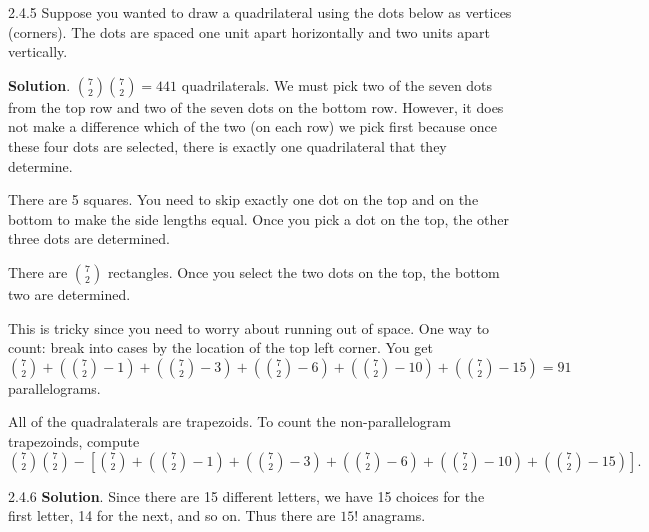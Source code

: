 \documentclass[11pt,]{book}
\theoremstyle{ptxplainnotitle}
\theoremstyle{ptxplaintitle}
\theoremstyle{ptxdefinitionnotitle}
\theoremstyle{ptxdefinitiontitle}
\theoremstyle{ptxdefinitionnotitle}
\theoremstyle{ptxdefinitiontitle}
\theoremstyle{ptxdefinitionnotitle}
\theoremstyle{ptxdefinitiontitle}
\theoremstyle{ptxdefinitiontitlenonumber}
\theoremstyle{ptxdefinitiontitlenonumber}
\numberwithin{equation}{chapter}
\begin{document}
\begin{divisionexercise}{2.4.5}
\hypertarget{p-1505}{}%
Suppose you wanted to draw a quadrilateral using the dots below as vertices (corners).  The dots are spaced one unit apart horizontally and two units apart vertically.%
\begin{sidebyside}{1}{0.23}{0.23}{0}
\begin{sbspanel}{0.54}
\end{sbspanel}
\end{sidebyside}
\par\medskip
\textbf{Solution}.\quad%
\hypertarget{p-1535}{}%
\({7\choose 2}{7\choose 2} = 441\) quadrilaterals. We must pick two of the seven dots from the top row and two of the seven dots on the bottom row. However, it does not make a difference which of the two (on each row) we pick first because once these four dots are selected, there is exactly one quadrilateral that they determine.%
\par
\hypertarget{p-1536}{}%
There are 5 squares. You need to skip exactly one dot on the top and on the bottom to make the side lengths equal. Once you pick a dot on the top, the other three dots are determined.%
\par
\hypertarget{p-1537}{}%
There are \({7 \choose 2}\) rectangles. Once you select the two dots on the top, the bottom two are determined.%
\par
\hypertarget{p-1538}{}%
This is tricky since you need to worry about running out of space. One way to count: break into cases by the location of the top left corner. You get \({7 \choose 2} + ({7 \choose 2}-1) + ({7 \choose 2} - 3) + ({7 \choose 2} - 6) + ({7 \choose 2} - 10) + ({7 \choose 2} - 15) = 91\) parallelograms.%
\par
\hypertarget{p-1539}{}%
All of the quadralaterals are trapezoids.  To count the non-parallelogram trapezoinds, compute \({7\choose 2}{7\choose 2} - \left[ {7 \choose 2} + ({7 \choose 2}-1) + ({7 \choose 2} - 3) + ({7 \choose 2} - 6) + ({7 \choose 2} - 10) + ({7 \choose 2} - 15) \right]\text{.}\)%
\end{divisionexercise}%
\begin{divisionexercise}{2.4.6}
\textbf{Solution}.\quad%
\hypertarget{p-1544}{}%
Since there are 15 different letters, we have 15 choices for the first letter, 14 for the next, and so on. Thus there are \(15!\) anagrams.%
\end{divisionexercise}%
\end{document}
